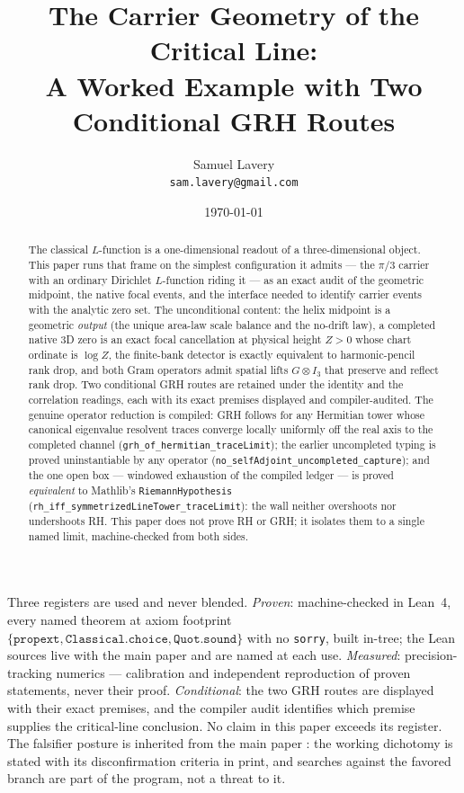 \documentclass[11pt]{article}
\title{The Carrier Geometry of the Critical Line:\\
A Worked Example with Two Conditional GRH Routes}
\author{Samuel Lavery\\ \texttt{sam.lavery@gmail.com}}
\date{\today}
\theoremstyle{definition}
\begin{document}
\maketitle

\begin{abstract}
The classical $L$-function is a one-dimensional readout of a
three-dimensional object.  This paper runs that frame on the simplest
configuration it admits --- the $\pi/3$ carrier with an ordinary Dirichlet
$L$-function riding it --- as an exact audit of the geometric midpoint, the
native focal events, and the interface needed to identify carrier events
with the analytic zero set.  The unconditional content: the helix midpoint
is a geometric \emph{output} (the unique area-law scale balance and the
no-drift law), a completed native 3D zero is an exact focal cancellation at
physical height $Z>0$ whose chart ordinate is $\log Z$, the finite-bank
detector is exactly equivalent to harmonic-pencil rank drop, and both Gram
operators admit spatial lifts $G\otimes I_3$ that preserve and reflect rank
drop.  Two conditional GRH routes are retained under the identity and the
correlation readings, each with its exact premises displayed and
compiler-audited.  The genuine operator reduction is compiled: GRH follows
for any Hermitian tower whose canonical eigenvalue resolvent traces converge
locally uniformly off the real axis to the completed channel
(\texttt{grh\_of\_hermitian\_traceLimit}); the earlier uncompleted typing is
proved uninstantiable by any operator
(\texttt{no\_selfAdjoint\_uncompleted\_capture}); and the one open box ---
windowed exhaustion of the compiled ledger --- is proved \emph{equivalent}
to Mathlib's \texttt{RiemannHypothesis}
(\texttt{rh\_iff\_symmetrizedLineTower\_traceLimit}): the wall neither
overshoots nor undershoots RH.  This paper does not prove RH or GRH; it
isolates them to a single named limit, machine-checked from both sides.
\end{abstract}

\medskip
\noindent Three registers are used and never blended.  \emph{Proven}:
machine-checked in Lean~4, every named theorem at axiom footprint
$\{\texttt{propext},\texttt{Classical.choice},\texttt{Quot.sound}\}$ with no
\texttt{sorry}, built in-tree; the Lean sources live with the main paper
\cite{UniversalCarrier} and are named at each use.  \emph{Measured}:
precision-tracking numerics --- calibration and independent reproduction of
proven statements, never their proof.  \emph{Conditional}: the two GRH
routes are displayed with their exact premises, and the compiler audit
identifies which premise supplies the critical-line conclusion.  No claim in
this paper exceeds its register.  The falsifier posture is inherited from
the main paper \cite{UniversalCarrier}: the working dichotomy is stated with
its disconfirmation criteria in print, and searches against the favored
branch are part of the program, not a threat to it.
\end{document}
